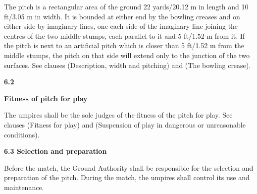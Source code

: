 \documentclass[12pt]{article}
\begin{document}
\vspace{\baselineskip}
\begin{adjustwidth}{0.0in}{0.08in}
{\fontsize{9pt}{10.8pt}\selectfont The pitch is a rectangular area of the ground 22 yards/20.12 m in length and 10 ft/3.05 m in width. It is bounded at either end by the bowling creases and on either side by imaginary lines, one each side of the imaginary line joining the centres of the two middle stumps, each parallel to it and 5 ft/1.52 m from it. If the pitch is next to an artificial pitch which is closer than 5 ft/1.52 m from the middle stumps, the pitch on that side will extend only to the junction of the two surfaces. See clauses (Description, width and pitching) and (The bowling crease).\par}\par

\end{adjustwidth}


\vspace{\baselineskip}
{\fontsize{11pt}{13.2pt}\selectfont \textbf{6.2 \tabto{0.47in} }{\fontsize{10pt}{12.0pt}\selectfont \textbf{Fitness of pitch for play}\par}\par}\par


\vspace{\baselineskip}
\begin{adjustwidth}{0.0in}{0.25in}
{\fontsize{9pt}{10.8pt}\selectfont The umpires shall be the sole judges of the fitness of the pitch for play. See clauses (Fitness for play) and  (Suspension of play in dangerous or unreasonable conditions).\par}\par

\end{adjustwidth}


\vspace{\baselineskip}
{\fontsize{11pt}{13.2pt}\selectfont \textbf{6.3 \tabto{0.47in} Selection and preparation}\par}\par


\vspace{\baselineskip}
\begin{adjustwidth}{0.0in}{0.07in}
{\fontsize{9pt}{10.8pt}\selectfont Before the match, the Ground Authority shall be responsible for the selection and preparation of the pitch. During the match, the umpires shall control its use and maintenance.\par}\par

\end{adjustwidth}
\end{document}
